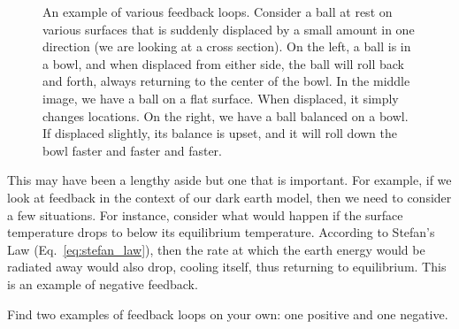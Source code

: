     \begin{figure}[ht]
    \centering
    \caption{An example of various feedback loops. Consider a ball at rest on various surfaces that is suddenly displaced by a small amount in one direction (we are looking at a cross section). On the left, a ball is in a bowl, and when displaced from either side, the ball will roll back and forth, always returning to the center of the bowl. In the middle image, we have a ball on a flat surface. When displaced, it simply changes locations. On the right, we have a ball balanced on a bowl. If displaced slightly, its balance is upset, and it will roll down the bowl faster and faster and faster.}
    \label{fig:feedback}
    \end{figure}

    This may have been a lengthy aside but one that is important. For example, if we look at feedback in the context of our dark earth model, then we need to consider a few situations. For instance, consider what would happen if the surface temperature drops to below its equilibrium temperature. According to Stefan's Law (Eq.~\ref{eq:stefan_law}), then the rate at which the earth energy would be radiated away would also drop, cooling itself, thus returning to equilibrium. This is an example of negative feedback.

    \begin{exercise}
        Find two examples of feedback loops on your own: one positive and one negative.
        \label{ex:feedback_loops}
    \end{exercise}



